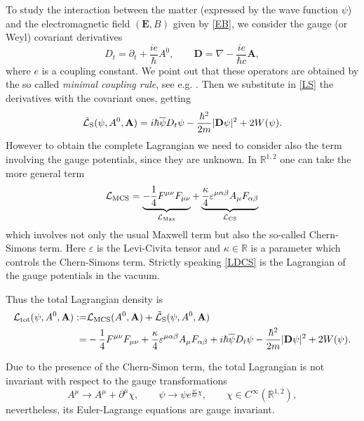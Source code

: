 \documentclass[11pt,leqno,twoside,reqno]{amsart}
\numberwithin{equation}{section}
\begin{document}
To study the interaction between the matter (expressed by the wave function $\psi$) and the electromagnetic field $(\mathbf{E},B)$ given by \eqref{EB}, 
we consider the gauge (or Weyl) covariant derivatives
$$ 
D_{t}= \partial_{t}+\frac{ie}{\hbar} A^{0},
\qquad
\mathbf D=\nabla -\frac{ie}{\hbar c}  \mathbf A,
$$
where $e$ is a coupling constant. 
We point out that these operators are obtained by the so called {\sl minimal coupling rule}, see e.g. \cite{Fel,Naber}.
Then we substitute in \eqref{LS} the derivatives with the covariant ones, getting
\[
\tilde{\mathcal{L}}_{\rm S}(\psi,A^0,\mathbf{A})= i \hbar \overline \psi  D_{t}\psi -\frac{\hbar^{2}}{2m} |\mathbf D \psi|^{2}+2W(\psi).
\]
However to obtain  the complete Lagrangian we need to consider also the term involving  the gauge potentials,
since they are unknown. In $\mathbb R^{1,2}$ one can take 
the more general term
\begin{equation}
\label{LDCS}
\mathcal{L}_{\rm MCS}=\underbrace{-\frac{1}{4} F^{\mu\nu} F_{\mu\nu}}_{\mathcal L_{\rm Max}}+ \underbrace{\frac{\kappa}{4}\varepsilon^{\mu\alpha\beta}A_{\mu}F_{\alpha\beta}}_{\mathcal{L}_{\rm CS}}
\end{equation}
which involves not only the usual Maxwell term but also the so-called Chern-Simons term.
Here $\varepsilon$ is the Levi-Civita tensor and $\kappa\in \mathbb R$ is a parameter which controls the Chern-Simons term.
Strictly speaking \eqref{LDCS} is the Lagrangian of the gauge potentials in the vacuum.

Thus the total Lagrangian density is
\begin{align*}
\mathcal L_{\rm tot}(\psi,A^0,\mathbf{A})
:= & 
\mathcal{L}_{\rm MCS}(A^0,\mathbf{A}) + \tilde{\mathcal{L}}_{\rm S}(\psi,A^0,\mathbf{A})\\
= & 
-\frac{1}{4} F^{\mu\nu} F_{\mu\nu}+ \frac{\kappa}{4}\varepsilon^{\mu\alpha\beta}A_{\mu}F_{\alpha\beta}
+i \hbar \overline \psi  D_{t}\psi -\frac{\hbar^{2}}{2m} |\mathbf D \psi|^{2}+2W(\psi).
\end{align*}

Due to the presence of the Chern-Simon term, the total Lagrangian is not  invariant 
with respect to the gauge transformations
\begin{equation}\label{invariance}
A^{\mu}\rightarrow A^{\mu}+\partial^{\mu}\chi,
\qquad
\psi \rightarrow \psi e^{\frac{ie}{\hbar c} \chi},
\qquad
\chi\in C^{\infty}(\mathbb R^{1,2}),
\end{equation}
nevertheless, its  Euler-Lagrange equations are gauge invariant.
\end{document}
